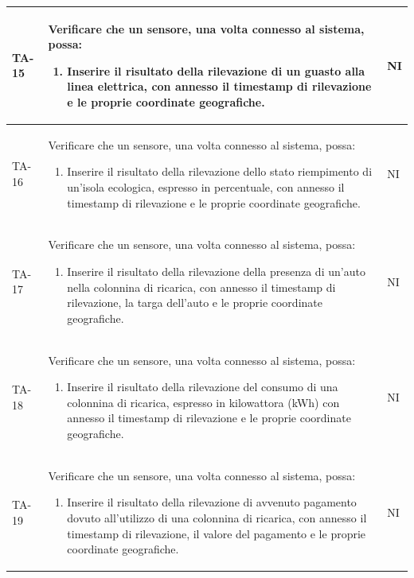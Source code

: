 \documentclass[8pt]{article}
\begin{document}
\begin{longtable}{|>{\centering}p{2cm}|>{\RaggedRight}m{12cm}|>{\centering\arraybackslash}p{2cm}|}
    \hline
    TA-15 &
    Verificare che un sensore, una volta connesso al sistema, possa:
    \begin{enumerate}
    \item Inserire il risultato della rilevazione di un guasto alla linea elettrica, con annesso il timestamp di rilevazione e le proprie coordinate geografiche. 
    \end{enumerate}
    & NI \\
    \hline
    TA-16 &
    Verificare che un sensore, una volta connesso al sistema, possa:
    \begin{enumerate}
    \item Inserire il risultato della rilevazione dello stato riempimento di un'isola ecologica, espresso in percentuale, con annesso il timestamp di rilevazione e le proprie coordinate geografiche. 
    \end{enumerate}
    & NI \\
    \hline
    TA-17 &
    Verificare che un sensore, una volta connesso al sistema, possa:
    \begin{enumerate}
    \item Inserire il risultato della rilevazione della presenza di un'auto nella colonnina di ricarica, con annesso il timestamp di rilevazione, la targa dell'auto e le proprie coordinate geografiche.  
    \end{enumerate}
    & NI \\
    \hline
    TA-18 &
    Verificare che un sensore, una volta connesso al sistema, possa:
    \begin{enumerate}
    \item Inserire il risultato della rilevazione del consumo di una colonnina di ricarica, espresso in kilowattora (kWh) con annesso il timestamp di rilevazione e le proprie coordinate geografiche.  
    \end{enumerate}
    & NI \\
    \hline
    TA-19 &
    Verificare che un sensore, una volta connesso al sistema, possa:
    \begin{enumerate}
    \item Inserire il risultato della rilevazione di avvenuto pagamento dovuto all'utilizzo di una colonnina di ricarica, con annesso il timestamp di rilevazione, il valore del pagamento e le proprie coordinate geografiche. 
    \end{enumerate}
    & NI \\
    \hline
\end{longtable}
\clearpage
\end{document}
